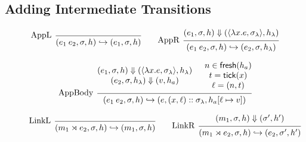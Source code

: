 \documentclass{article}
\theoremstyle{definition}
\newcommand*{\cons}{::}
\newcommand*{\ctx}{\sigma}
\newcommand*{\mem}{h}
\newcommand*{\semarrow}{\hookrightarrow}
\newcommand*{\link}[2]{{#1}\rtimes{#2}}
\newcommand*{\tick}{\mathsf{tick}}
\newcommand*{\fresh}{\mathsf{fresh}}
\begin{document}
\subsection{Adding Intermediate Transitions}
\begin{figure}[h!]
  \footnotesize
  \begin{flushright}
    \fbox{$(e\text{ or }m,s)\semarrow (e\text{ or }m,s)$}
  \end{flushright}
  \centering
  \vspace{0pt} %
  \[
    \begin{prooftree}
      \infer[left label={AppL}]0{
      (e_{1}\:e_{2}, \ctx, \mem)
      \semarrow
      (e_{1}, \ctx, \mem)
      }
    \end{prooftree}\qquad
    \begin{prooftree}
      \hypo{
        \begin{matrix}
          (e_{1}, \ctx, \mem)
          \Downarrow
          (\langle\lambda x.e, \ctx_{\lambda}\rangle,\mem_\lambda)
        \end{matrix}
      }
      \infer[left label={AppR}]1{
      (e_{1}\:e_{2}, \ctx, \mem)
      \semarrow
      (e_{2}, \ctx, \mem_\lambda)
      }
    \end{prooftree}
  \]

  \[
    \begin{prooftree}
      \hypo{
        \begin{matrix}
          (e_{1}, \ctx, \mem)
          \Downarrow
          (\langle\lambda x.e, \ctx_{\lambda}\rangle,\mem_\lambda) \\
          (e_{2}, \ctx, \mem_\lambda)
          \Downarrow
          (v, \mem_a)
        \end{matrix}
      }
      \hypo{
        \begin{matrix}
          n\in\fresh(\mem_a) \\
          t=\tick(x)         \\
          \ell=(n,t)
        \end{matrix}
      }
      \infer[left label={AppBody}]2{
      (e_{1}\:e_{2}, \ctx, \mem)
      \semarrow
      (e, (x, \ell)\cons \ctx_{\lambda}, \mem_a[\ell\mapsto v])
      }
    \end{prooftree}
  \]

  \[
    \begin{prooftree}
      \infer[left label=LinkL]0{
      (\link{m_{1}}{e_{2}}, \ctx, \mem)
      \semarrow
      (m_{1}, \ctx, \mem)
      }
    \end{prooftree}\qquad
    \begin{prooftree}
      \hypo{
        \begin{matrix}
          (m_{1}, \ctx, \mem)
          \Downarrow
          (\ctx', \mem')
        \end{matrix}
      }
      \infer[left label=LinkR]1{
      (\link{m_{1}}{e_{2}}, \ctx, \mem)
      \semarrow
      (e_{2}, \ctx', \mem')
      }
    \end{prooftree}
  \]


\end{figure}
\end{document}
